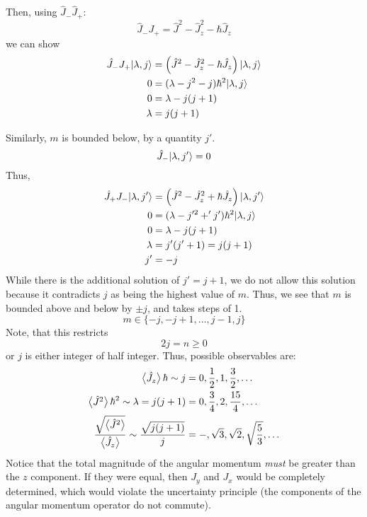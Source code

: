 Then, using \(\hat J_-\hat J_+\):
\begin{equation}
	\hat J_- J_+ = \hat J^2 - \hat J_z^2 - \hbar \hat J_z
\end{equation}
we can show
\begin{align}
	\hat J_- J_+\lvert\lambda, j\rangle &=\left( \hat J^2 - \hat J_z^2 - \hbar \hat J_z\right)\lvert\lambda, j\rangle\nonumber\\
				0  &=(\lambda - j^2 - j) \hbar^2 \lvert\lambda, j\rangle\nonumber\\
				0  & = \lambda- j(j+1)\nonumber\\
				\lambda &= j(j+1)
\end{align}

Similarly, \(m\) is bounded below, by a quantity \(j'\). 
\begin{equation}
	\hat J_- \lvert\lambda, j'\rangle = 0
\end{equation}
Thus,
\begin{align}
	\hat J_+ J_-\lvert\lambda, j'\rangle &=\left( \hat J^2 - \hat J_z^2 + \hbar \hat J_z\right)\lvert\lambda, j'\rangle\nonumber\\
				0  &=(\lambda - j'^2 +' j') \hbar^2 \lvert\lambda, j\rangle\nonumber\\
				0  & = \lambda- j(j+1)\nonumber\\
				\lambda &= j'(j'+1) = j(j+1)\nonumber\\
				j'&=-j
\end{align}
While there is the additional solution of \(j'=j+1\), we do not allow this solution because it contradicts \(j\) as being the highest value of \(m\). Thus, we see that \(m\) is bounded above and below by \(\pm j\), and takes steps of 1. 
\begin{equation}
	m\in\{-j, -j+1, \ldots , j-1, j\}
\end{equation}
Note, that this restricts
\begin{equation}
	2j = n \geq 0
\end{equation}
or \(j\) is either integer of half integer. Thus, possible observables are:
\begin{subequations}
\begin{align}
	\left\langle \begin{matrix}\hat{J}_z\end{matrix} \right\rangle{\hbar}\sim j &= 0,\frac{1}{2}, 1, \frac{3}{2}, \ldots\\
	\left\langle \begin{matrix}\hat{J}^2\end{matrix} \right\rangle{\hbar^2}\sim \lambda = j(j+1) &= 0, \frac{3}{4}, 2, \frac{15}{4}, \ldots\\
	\frac{\sqrt{\left\langle \begin{matrix}\hat{J}^2\end{matrix} \right\rangle}}{\left\langle \begin{matrix}\hat{J}_z\end{matrix} \right\rangle}\sim \frac{\sqrt{j(j+1)}}{j} &= -, \sqrt{3}, \sqrt{2}, \sqrt{\frac{5}{3}},\ldots
\end{align}
\end{subequations}
Notice that the total magnitude of the angular momentum \emph{must} be greater than the \(z\) component. If they were equal, then \(J_y\) and \(J_x\) would be completely determined, which would violate the uncertainty principle (the components of the angular momentum operator do not commute).

